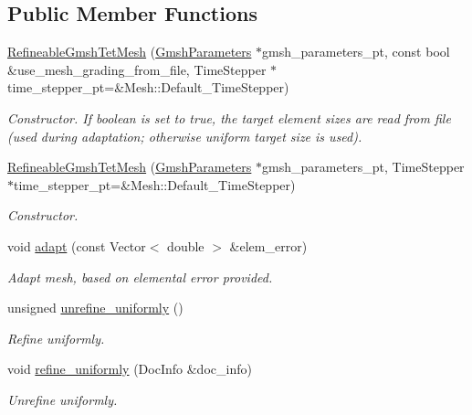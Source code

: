 \subsection*{Public Member Functions}
\begin{DoxyCompactItemize}
\item 
\hyperlink{classoomph_1_1RefineableGmshTetMesh_ae7f3a8f3481168bdb8039f6355b50cf0}{Refineable\+Gmsh\+Tet\+Mesh} (\hyperlink{classoomph_1_1GmshParameters}{Gmsh\+Parameters} $\ast$gmsh\+\_\+parameters\+\_\+pt, const bool \&use\+\_\+mesh\+\_\+grading\+\_\+from\+\_\+file, Time\+Stepper $\ast$time\+\_\+stepper\+\_\+pt=\&Mesh\+::\+Default\+\_\+\+Time\+Stepper)
\begin{DoxyCompactList}\small\item\em Constructor. If boolean is set to true, the target element sizes are read from file (used during adaptation; otherwise uniform target size is used). \end{DoxyCompactList}\item 
\hyperlink{classoomph_1_1RefineableGmshTetMesh_ac2e041133fd618679af2594465ee4758}{Refineable\+Gmsh\+Tet\+Mesh} (\hyperlink{classoomph_1_1GmshParameters}{Gmsh\+Parameters} $\ast$gmsh\+\_\+parameters\+\_\+pt, Time\+Stepper $\ast$time\+\_\+stepper\+\_\+pt=\&Mesh\+::\+Default\+\_\+\+Time\+Stepper)
\begin{DoxyCompactList}\small\item\em Constructor. \end{DoxyCompactList}\item 
void \hyperlink{classoomph_1_1RefineableGmshTetMesh_ad3ee00690d125ab8211f64d5c85dd3b9}{adapt} (const Vector$<$ double $>$ \&elem\+\_\+error)
\begin{DoxyCompactList}\small\item\em Adapt mesh, based on elemental error provided. \end{DoxyCompactList}\item 
unsigned \hyperlink{classoomph_1_1RefineableGmshTetMesh_aa243fd14b5f168f541e5451766a9f68d}{unrefine\+\_\+uniformly} ()
\begin{DoxyCompactList}\small\item\em Refine uniformly. \end{DoxyCompactList}\item 
void \hyperlink{classoomph_1_1RefineableGmshTetMesh_a8d71e18a1181d79c475217cfab320674}{refine\+\_\+uniformly} (Doc\+Info \&doc\+\_\+info)
\begin{DoxyCompactList}\small\item\em Unrefine uniformly. \end{DoxyCompactList}\end{DoxyCompactItemize}
